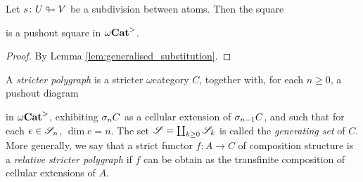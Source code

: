 \begin{cor} \label{cor:pushout_principal_cell}
    Let \( s \colon U \looparrowright V \) be a subdivision between atoms.
    Then the square
    \begin{center}
    \end{center}
    is a pushout square in \( {\omega\mathbf{Cat}}^> \).
\end{cor}
\begin{proof}
    By Lemma \ref{lem:generalised_substitution}.
\end{proof}

\begin{dfn} 
    A \emph{stricter polygraph} is a stricter \( \omega \)\nbd category \( C \), together with, for each \( n \geq 0 \), a pushout diagram
    \begin{center}
    \end{center}
    in \( {\omega\mathbf{Cat}}^> \), exhibiting \( \sigma_{n}C \) as a cellular extension of \( \sigma_{n - 1}C \), and such that for each \( e \in \mathscr{S}_n \), \( \dim e = n \).
    The set \( \mathscr{S} = \coprod_{k \geq 0} \mathscr{S}_k \) is called the \emph{generating set} of \( C \).
    More generally, we say that a strict functor \( f \colon A \to C \) of composition structure is a \emph{relative stricter polygraph} if \( f \) can be obtain as the transfinite composition of cellular extensions of \( A \).
\end{dfn}

